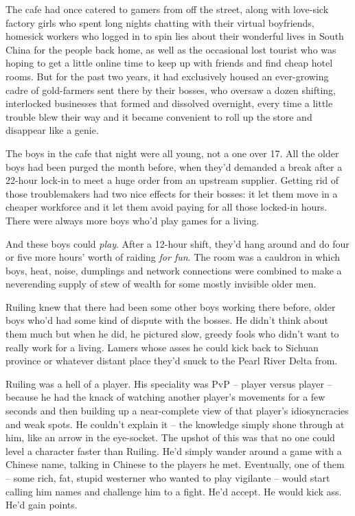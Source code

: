 The cafe had once catered to gamers from off the street, along with
love-sick factory girls who spent long nights chatting with their
virtual boyfriends, homesick workers who logged in to spin lies
about their wonderful lives in South China for the people back
home, as well as the occasional lost tourist who was hoping to get
a little online time to keep up with friends and find cheap hotel
rooms. But for the past two years, it had exclusively housed an
ever-growing cadre of gold-farmers sent there by their bosses, who
oversaw a dozen shifting, interlocked businesses that formed and
dissolved overnight, every time a little trouble blew their way and
it became convenient to roll up the store and disappear like a
genie.

The boys in the cafe that night were all young, not a one over 17.
All the older boys had been purged the month before, when they'd
demanded a break after a 22-hour lock-in to meet a huge order from
an upstream supplier. Getting rid of those troublemakers had two
nice effects for their bosses: it let them move in a cheaper
workforce and it let them avoid paying for all those locked-in
hours. There were always more boys who'd play games for a living.

And these boys could \emph{play}. After a 12-hour shift, they'd
hang around and do four or five more hours' worth of raiding
\emph{for fun}. The room was a cauldron in which boys, heat, noise,
dumplings and network connections were combined to make a
neverending supply of stew of wealth for some mostly invisible
older men.

Ruiling knew that there had been some other boys working there
before, older boys who'd had some kind of dispute with the bosses.
He didn't think about them much but when he did, he pictured slow,
greedy fools who didn't want to really work for a living. Lamers
whose asses he could kick back to Sichuan province or whatever
distant place they'd snuck to the Pearl River Delta from.

Ruiling was a hell of a player. His speciality was PvP -- player
versus player -- because he had the knack of watching another
player's movements for a few seconds and then building up a
near-complete view of that player's idiosyncracies and weak spots.
He couldn't explain it -- the knowledge simply shone through at
him, like an arrow in the eye-socket. The upshot of this was that
no one could level a character faster than Ruiling. He'd simply
wander around a game with a Chinese name, talking in Chinese to the
players he met. Eventually, one of them -- some rich, fat, stupid
westerner who wanted to play vigilante -- would start calling him
names and challenge him to a fight. He'd accept. He would kick ass.
He'd gain points.

